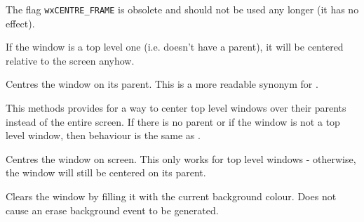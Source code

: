 The flag {\tt wxCENTRE\_FRAME} is obsolete and should not be used any longer
(it has no effect).


If the window is a top level one (i.e. doesn't have a parent), it will be
centered relative to the screen anyhow.




\label{wxwindowcentreonparent}


Centres the window on its parent. This is a more readable synonym for
.




This methods provides for a way to center top level windows over their
parents instead of the entire screen.  If there is no parent or if the
window is not a top level window, then behaviour is the same as
.




\label{wxwindowcentreonscreen}


Centres the window on screen. This only works for top level windows -
otherwise, the window will still be centered on its parent.






\label{wxwindowclearbackground}


Clears the window by filling it with the current background colour. Does not
cause an erase background event to be generated.


